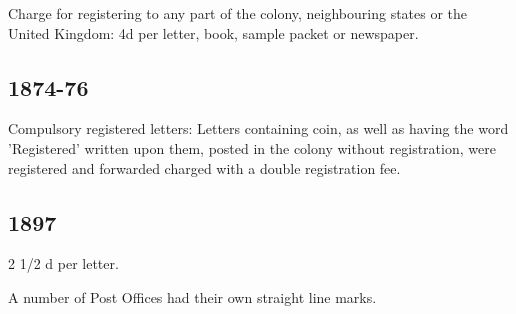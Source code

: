 Charge for registering to any part of the colony, neighbouring states 
or the United Kingdom: 4d per letter, book, sample packet or newspaper.

\subsection{1874-76}

Compulsory registered letters: Letters containing coin, 
as well as having the word 'Registered' written upon them, 
posted in the colony without registration, were registered 
and forwarded charged with a double registration fee.

\subsection{1897}

2 1/2 d per letter.

   
   
A number of Post Offices had their own straight line marks.   
   
   
                   